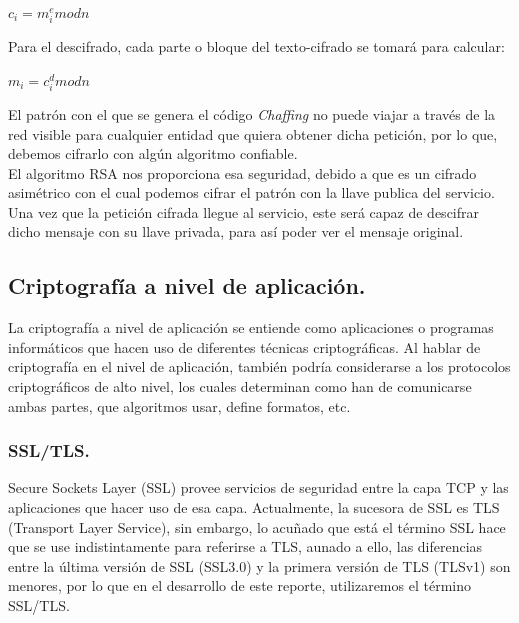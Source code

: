 \documentclass[12pt, a4paper, titlepage]{report}
\begin{document}
		    \begin{center}
		        $c_i=m^{e}_imodn$
		    \end{center}
		    
		    Para el descifrado, cada parte o bloque del texto-cifrado se tomará para calcular:
		    
		    \begin{center}
		        $m_i=c^{d}_imodn$
		    \end{center}
		    
		    El patrón con el que se genera el código \textit{Chaffing} no puede viajar a través de la red visible para cualquier entidad que quiera obtener dicha petición, por lo que, debemos cifrarlo con algún algoritmo confiable.\\
		    El algoritmo RSA nos proporciona esa seguridad, debido a que es un cifrado asimétrico con el cual podemos cifrar el patrón con la llave publica del servicio. Una vez que la petición cifrada llegue al servicio, este será capaz de descifrar dicho mensaje con su llave privada, para así poder ver el mensaje original.\\
        		
	    
            
            \subsection{Criptografía a nivel de aplicación.}
                La criptografía a nivel de aplicación se entiende como aplicaciones o programas informáticos que hacen uso de diferentes técnicas criptográficas. Al hablar de criptografía en el nivel de aplicación, también podría considerarse a los protocolos criptográficos de alto nivel, los cuales determinan como han de comunicarse ambas partes, que algoritmos usar, define formatos, etc.\cite{refCriptografia} 
                
                \subsubsection{SSL/TLS.}
                Secure Sockets Layer (SSL) provee servicios de seguridad entre la capa TCP y las aplicaciones que hacer uso de esa capa. Actualmente, la sucesora de SSL es TLS (Transport Layer Service), sin embargo, lo acuñado que está el término SSL hace que se use indistintamente para referirse a TLS, aunado a ello, las diferencias entre la última versión de SSL (SSL3.0) y la primera versión de TLS (TLSv1) son menores, por lo que en el desarrollo de este reporte, utilizaremos el término SSL/TLS.\\
                
\end{document}
